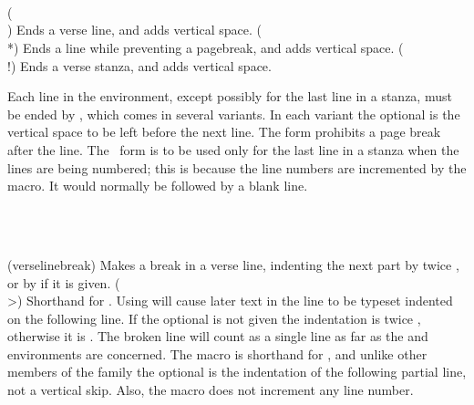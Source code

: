 \begin{syntax}
\cmd{\\} \\
\cmd{\\*} \\
\cmdprint{\\!} \\
\end{syntax}
\glossary(\\)%
  {\Vprint{\\}}%
  {Ends a verse line, and adds  vertical space.}
\glossary(\\*)%
  {\Vprint{\\*}}%
  {Ends a line while preventing a pagebreak, and adds  vertical space.}
\glossary(\\!)
  {\Vprint{\\!}}%
  {Ends a verse stanza, and adds  vertical space.}

Each line in the  environment, except possibly for the last line
in a stanza, 
must be ended by \cmd{\\}, which comes in several variants. In each variant
the optional  is the vertical space to be left before the next
line. The \cmd{\\*} form prohibits a page 
break after the line. 
The \pixslashbang\ form is to be used only for the last 
line in a stanza
when the lines are being numbered; this is because the line 
numbers are incremented by the \cmd{\\} macro. 
It would normally be followed by a blank line.

\begin{syntax}
\cmd{\verselinebreak} \\
\cmdprint{\\>} \\
\end{syntax}
\glossary(verselinebreak)
  {}%
  {Makes a break in a verse line, indenting the next part by twice ,
   or by  if it is given.}
\glossary(\\>)
  {\Vprint{\\>}}%
  {Shorthand for .}
Using \cmd{\verselinebreak} will cause later
text in the line to be typeset 
indented on the following line. 
If the optional  is not given
the indentation is twice \lnc{\vgap}, otherwise it is .
The broken line will count as a single line as far as the 
and  environments are concerned. The macro \cmd{\\>} is
shorthand for \cmd{\verselinebreak}, and unlike other members of the \cmd{\\}
family the optional  is the indentation of the following 
partial line, not a vertical skip. 
Also, the \cmd{\\>} macro does not increment any 
line number.

